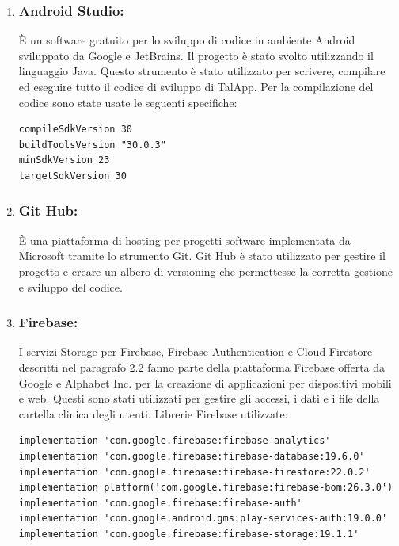 \documentclass[12pt,a4paper,openright,twoside]{report}
\begin{document}
\begin{enumerate}
\item \subsubsection{Android Studio:} \`E un software gratuito per lo sviluppo di codice in ambiente Android sviluppato da Google e JetBrains. Il progetto è stato svolto utilizzando il linguaggio Java. Questo strumento è stato utilizzato per scrivere, compilare ed eseguire tutto il codice di sviluppo di TalApp. Per la compilazione del codice sono state usate le seguenti specifiche:

\begingroup
\fontsize{10pt}{11pt}\selectfont
\begin{verbatim}
compileSdkVersion 30
buildToolsVersion "30.0.3"
minSdkVersion 23
targetSdkVersion 30
\end{verbatim}
\endgroup

\item \subsubsection{Git Hub:} \`E una piattaforma di hosting per progetti software implementata da Microsoft tramite lo strumento Git. Git Hub è stato utilizzato per gestire il progetto e creare un albero di versioning che permettesse la corretta gestione e sviluppo del codice.

\item \subsubsection{Firebase:} I servizi Storage per Firebase, Firebase Authentication e Cloud Firestore descritti nel paragrafo 2.2 fanno parte della piattaforma Firebase offerta da  Google e Alphabet Inc. per la creazione di applicazioni per dispositivi mobili e web. Questi sono stati utilizzati per gestire gli accessi, i dati e i file della cartella clinica degli utenti. Librerie Firebase utilizzate:
\begingroup
\fontsize{10pt}{12pt}\selectfont
\begin{verbatim}
implementation 'com.google.firebase:firebase-analytics'
implementation 'com.google.firebase:firebase-database:19.6.0'
implementation 'com.google.firebase:firebase-firestore:22.0.2'
implementation platform('com.google.firebase:firebase-bom:26.3.0')
implementation 'com.google.firebase:firebase-auth'
implementation 'com.google.android.gms:play-services-auth:19.0.0'
implementation 'com.google.firebase:firebase-storage:19.1.1'
\end{verbatim}
\endgroup    

\end{enumerate}
\end{document}
